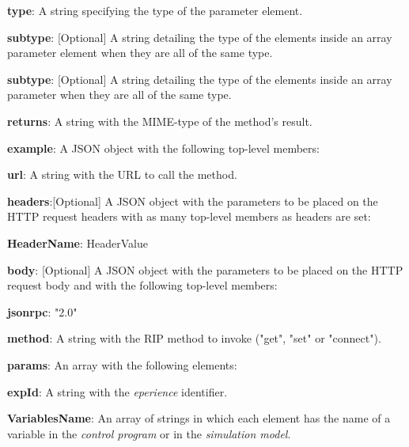 \begin{myEnumerate}
\begin{myEnumerate}
\begin{myEnumerate}
\begin{myEnumerate}
\begin{myEnumerate}
                    \item \textbf{type}: A string specifying the type of the parameter element.
                    \item \textbf{subtype}: [Optional] A string detailing the type of the elements inside an array parameter element when they are all of the same type.
                \end{myEnumerate}
                \item \textbf{subtype}: [Optional] A string detailing the type of the elements inside an array parameter when they are all of the same type.
            \end{myEnumerate}
            \item \textbf{returns}: A string with the MIME-type of the method's result.
            \item \textbf{example}: A JSON object with the following top-level members:
            \begin{myEnumerate}
                    \item \textbf{url}: A string with the URL to call the method.
                    \item \textbf{headers}:[Optional] A JSON object with the parameters to be placed on the HTTP request headers with as many top-level members as headers are set:
                    \begin{myEnumerate}
                        \item \textbf{HeaderName}: HeaderValue
                    \end{myEnumerate}
                    \item \textbf{body}: [Optional] A JSON object with the parameters to be placed on the HTTP request body and with the following top-level members:
                    \begin{myEnumerate}
                        \item \textbf{jsonrpc}: "2.0"
                        \item \textbf{method}: A string with the RIP method to invoke ("get", "set" or "connect"). %
                        \item \textbf{params}: An array with the following elements:
                        \begin{myEnumerate}
                            \item \textbf{expId}: A string with the \textit{eperience} identifier.
                            \item \textbf{VariablesName}: An array of strings in which each element has the name of a variable in the \textit{control program} or in the \textit{simulation model}.

\end{myEnumerate}
\end{myEnumerate}
\end{myEnumerate}
\end{myEnumerate}
\end{myEnumerate}
\end{myEnumerate}
